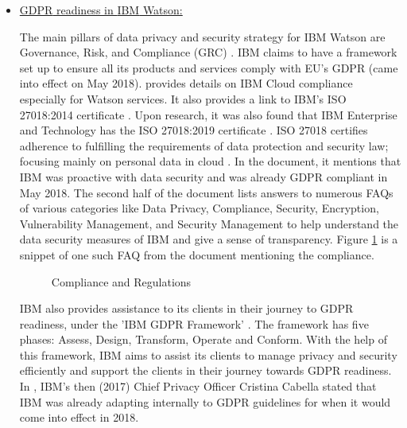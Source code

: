 \begin{itemize}
    \item \underline{\acs{GDPR} readiness in \acs{IBM} Watson:}    
    
    The main pillars of data privacy and security strategy for \acs{IBM} Watson are Governance, Risk, and Compliance (GRC) \cite{ibmgdpr}. \acs{IBM} claims \cite{ibmgdpr3} to have a framework set up to ensure all its products and services comply with \acs{EU}'s \acs{GDPR} (came into effect on May 2018). \cite{ibmgdpr} provides details on \acs{IBM} Cloud compliance especially for Watson services. It also provides a link to IBM's \acs{ISO} 27018:2014 certificate \cite{ibmisocert}. Upon research, it was also found that \acs{IBM} Enterprise and Technology has the \acs{ISO} 27018:2019 certificate \cite{ibmisocert2}. \ac{ISO} 27018 certifies adherence to fulfilling the requirements of data protection and security law; focusing mainly on personal data in cloud \cite{isocert}. In the document, it mentions that \acs{IBM} was proactive with data security and was already \acs{GDPR} compliant in May 2018. The second half of the document lists answers to numerous  \ac{FAQ}s of various categories like Data Privacy, Compliance, Security, Encryption, Vulnerability Management, and Security Management to help understand the data security measures of \acs{IBM} and give a sense of transparency. Figure \ref{ibmgdpr} is a snippet of one such \acs{FAQ}  from the document \cite{ibmgdpr} mentioning the compliance.
    
    \begin {figure}[ht]
    \centering
    \caption{Compliance and Regulations}
    \label{ibmgdpr}
    \end {figure}
    
    \acs{IBM} also provides assistance to its clients in their journey to \acs{GDPR} readiness, under the '\acs{IBM} \acs{GDPR} Framework' \cite{ibmgdprservice}. The framework has five phases: Assess, Design, Transform, Operate and Conform. With the help of this framework, \acs{IBM} aims to assist its clients to manage privacy and security efficiently and support the clients in their journey towards \acs{GDPR} readiness. In \cite{ibmgdpr2}, IBM's then (2017) Chief Privacy Officer Cristina Cabella stated that \acs{IBM} was already adapting internally to \acs{GDPR} guidelines for when it would come into effect in 2018.
    

\end{itemize}
